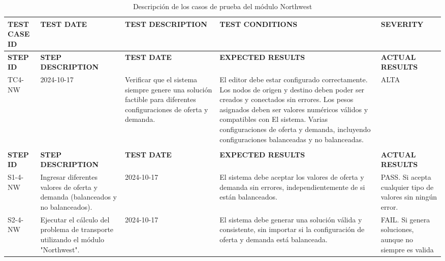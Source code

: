\begin{longtable}{|p{2cm}|p{3cm}|p{3cm}|p{3cm}|p{3cm}|}
\caption{Descripción de los casos de prueba del módulo Northwest} \label{tab:casos_prueba} \\
\hline
\textbf{TEST CASE ID} & \textbf{TEST DATE} & \textbf{TEST DESCRIPTION} & \textbf{TEST CONDITIONS} & \textbf{SEVERITY                                                                                       \\} \\ \hline
\endfirsthead
\hline
\textbf{STEP ID} & \textbf{STEP DESCRIPTION} & \textbf{TEST DATE} & \textbf{EXPECTED RESULTS} & \textbf{ACTUAL RESULTS} \\ \hline
\endhead
TC4-NW & 2024-10-17 & Verificar que el sistema siempre genere una solución factible para diferentes configuraciones de oferta y demanda. & El editor debe estar configurado correctamente. Los nodos de origen y destino deben poder ser creados y conectados sin errores. Los pesos asignados deben ser valores numéricos válidos y compatibles con El sistema. Varias configuraciones de oferta y demanda, incluyendo configuraciones balanceadas y no balanceadas. & ALTA                                                                                           \\ \\ \hline
\textbf{STEP ID} & \textbf{STEP DESCRIPTION} & \textbf{TEST DATE} & \textbf{EXPECTED RESULTS} & \textbf{ACTUAL RESULTS} \\ \hline
S1-4-NW & Ingresar diferentes valores de oferta y demanda (balanceados y no balanceados). & 2024-10-17 & El sistema debe aceptar los valores de oferta y demanda sin errores, independientemente de si están balanceados. & PASS. Si acepta cualquier tipo de valores sin ningún error. \\ \hline
S2-4-NW & Ejecutar el cálculo del problema de transporte utilizando el módulo "Northwest". & 2024-10-17 & El sistema debe generar una solución válida y consistente, sin importar si la configuración de oferta y demanda está balanceada. & FAIL. Si genera soluciones, aunque no siempre es valida \\ \hline
\end{longtable}